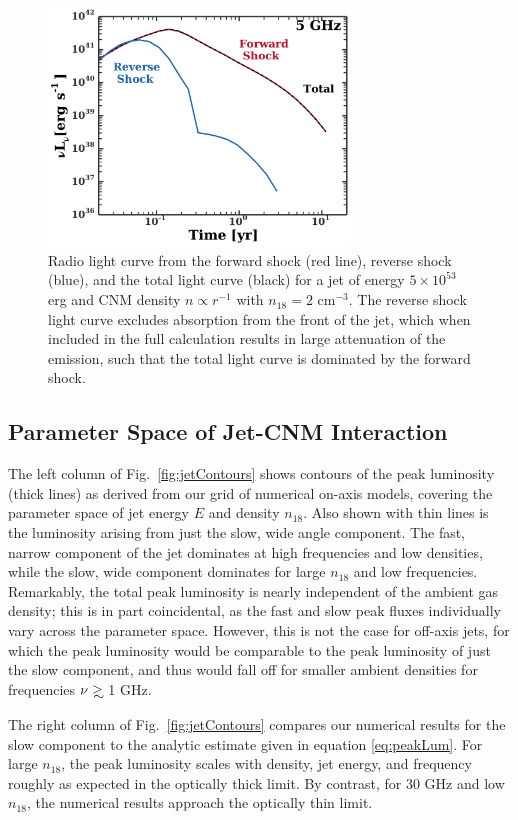 \documentclass[usenatbib,fleqn]{mnras}
\newcommand\gsim{\mathrel{\rlap{\lower4pt\hbox{\hskip1pt$\sim$}}
    \raise1pt\hbox{$>$}}}
\begin{document}
\begin{figure}
  \includegraphics[width=8cm]{reverse.pdf}
  \caption{\label{fig:reverse} Radio light curve from the forward
    shock (red line), reverse shock (blue), and the total light curve
    (black) for a jet of energy $5\times 10^{53}$ erg and CNM density
    $n\propto r^{-1}$ with $n_{18} = 2$ cm$^{-3}$. The reverse shock
    light curve excludes absorption from the front of the jet, which
    when included in the full calculation results in large attenuation
    of the emission, such that the total light curve is dominated by
    the forward shock.}
\end{figure}

\subsection{Parameter Space of Jet-CNM Interaction}
\label{sec:param}
The left column of Fig.~\ref{fig:jetContours} shows contours of the
peak luminosity (thick lines) as derived from our grid of numerical
on-axis models, covering the parameter space of jet energy $E$ and
density $n_{18}$.  Also shown with thin lines is the luminosity
arising from just the slow, wide angle component.  The fast, narrow
component of the jet dominates at high frequencies and low densities,
while the slow, wide component dominates for large $n_{18}$ and low
frequencies.  Remarkably, the total peak luminosity is nearly
independent of the ambient gas density; this is in part coincidental,
as the fast and slow peak fluxes individually vary across the
parameter space. However, this is not the case for off-axis jets,
for which the peak luminosity would be comparable to the peak
luminosity of just the slow component, and thus would fall off for
smaller ambient densities for frequencies $\nu\gsim$ 1 GHz. 

The right column of Fig.~\ref{fig:jetContours} compares our numerical
results for the slow component to the analytic estimate given in
equation \eqref{eq:peakLum}.  For large $n_{18}$, the peak luminosity
scales with density, jet energy, and frequency roughly as expected in
the optically thick limit.  By contrast, for 30 GHz and low $n_{18}$,
the numerical results approach the optically thin limit.
\end{document}
